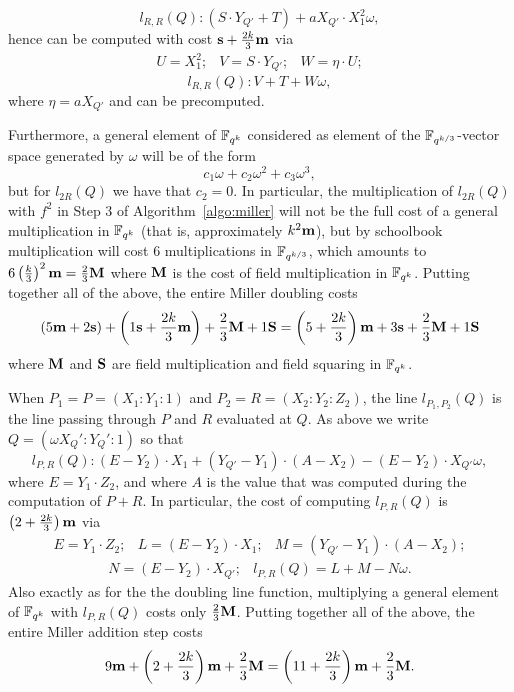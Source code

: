 \[l_{R,R}(Q): (S \cdot Y_{Q'} + T) + a X_{Q'} \cdot X_1^2 \omega,\]
hence can be computed with cost $\textbf{s} + \frac{2k}{3}\textbf{m}$ via
\[\begin{array}{ccc}
U = X_1^2; & V = S \cdot Y_{Q'}; & W = \eta \cdot U;
\end{array}\]
\[l_{R,R}(Q): V+T + W\omega,\]
where $\eta = aX_{Q'}$ and can be precomputed.

Furthermore, a general element of $\mathbb{F}_{q^k}$ considered as element of the $\mathbb{F}_{q^{k/3}}$-vector space generated
by $\omega$ will be of the form 
\[c_1 \omega + c_2 \omega^2 + c_3 \omega^3,\]
but for $l_{2R}(Q)$ we have that $c_2 = 0$. In particular, the multiplication of $l_{2R}(Q)$ with $f^2$ in
Step 3 of Algorithm~\ref{algo:miller} will not be the full cost of a general multiplication in $\mathbb{F}_{q^k}$ (that
is, approximately $k^2\textbf{m}$), but by schoolbook multiplication will cost 6 multiplications in $\mathbb{F}_{q^{k/3}}$, which
amounts to $6 \left(\frac{k}{3}\right)^2 \textbf{m} = \frac{2}{3} \textbf{M}$
where $\textbf{M}$ is the cost of field multiplication in $\mathbb{F}_{q^k}$.
Putting together all of the above, the entire Miller doubling costs
\[(5\textbf{m} + 2\textbf{s}) + \left(1\textbf{s} + \frac{2k}{3}\textbf{m}\right) + \frac{2}{3}\textbf{M}  + 1\textbf{S} 
= \left( 5 + \frac{2k}{3}\right)\textbf{m} + 3\textbf{s} + \frac{2}{3}\textbf{M} + 1\textbf{S}\]
where $\textbf{M}$ and $\textbf{S}$ are field multiplication and field squaring in $\mathbb{F}_{q^k}$.

When $P_1  = P = (X_1:Y_1:1)$ and $P_2 = R = (X_2:Y_2:Z_2)$, 
the line $l_{P_1,P_2}(Q)$ is the line passing through $P$ and $R$ evaluated at $Q$.
As above we write $Q = (\omega X_Q':Y_Q':1)$ so that
$$l_{P,R}(Q): (E - Y_2) \cdot X_1 + (Y_{Q'} - Y_1) \cdot (A - X_2) - (E - Y_2) \cdot X_{Q'}\omega,  $$
where $E = Y_1 \cdot Z_2$, and where $A$ is the value that was computed during the computation of $P+R$.
In particular, the cost of computing $l_{P,R}(Q)$ is $\left(2 + \frac{2k}{3}\right)\textbf{m}$ via
\[\begin{array}{ccc}
E = Y_1 \cdot Z_2; & L = (E-Y_2)\cdot X_1; 
& M = (Y_{Q'} - Y_1) \cdot (A - X_2); 
\end{array}\]
\[\begin{array}{cc}
N = (E - Y_2) \cdot X_{Q'}; &
l_{P,R}(Q) = L + M - N\omega.
\end{array}\]
Also exactly as for the the doubling line function, multiplying a general element of $\mathbb{F}_{q^k}$ with $l_{P,R}(Q)$ costs only
$\frac{2}{3}\textbf{M}$.
Putting together all of the above, the entire Miller addition step costs
\[9\textbf{m} + \left(2 + \frac{2k}{3}\right)\textbf{m} + \frac{2}{3}\textbf{M} 
= \left(11 + \frac{2k}{3}\right)\textbf{m} + \frac{2}{3}\textbf{M}.\]

